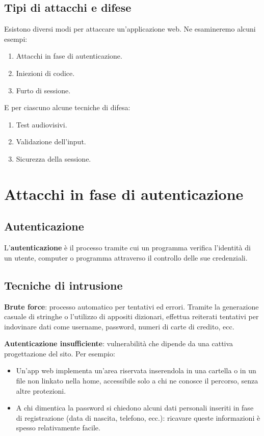 \subsection{Tipi di attacchi e difese}

Esistono diversi modi per attaccare un'applicazione web. Ne esamineremo alcuni esempi:

\begin{enumerate}
    \item Attacchi in fase di autenticazione.
    \item Iniezioni di codice.
    \item Furto di sessione.
\end{enumerate}

E per ciascuno alcune tecniche di difesa:

\begin{enumerate}
    \item Test audiovisivi.
    \item Validazione dell'input.
    \item Sicurezza della sessione.
\end{enumerate}

\section{Attacchi in fase di autenticazione}

\subsection{Autenticazione}

L'\textbf{autenticazione} è il processo tramite cui un programma verifica l'identità di un utente, computer o programma attraverso il controllo delle sue credenziali.

\subsection{Tecniche di intrusione}

\textbf{Brute force}: processo automatico per tentativi ed errori. Tramite la generazione casuale di stringhe o l'utilizzo di appositi dizionari, effettua reiterati tentativi per indovinare dati come username, password, numeri di carte di credito, ecc.

\textbf{Autenticazione insufficiente}: vulnerabilità che dipende da una cattiva progettazione del sito. Per esempio:

\begin{itemize}
    \item Un'app web implementa un'area riservata inserendola in una cartella o in un file non linkato nella home, accessibile solo a chi ne conosce il percorso, senza altre protezioni.
    \item A chi dimentica la password si chiedono alcuni dati personali inseriti in fase di registrazione (data di nascita, telefono, ecc.): ricavare queste informazioni è spesso relativamente facile.
\end{itemize}

